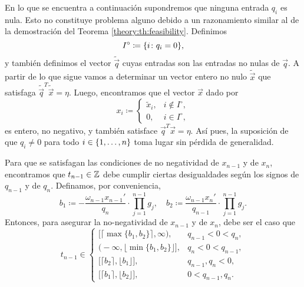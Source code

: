 En lo que se encuentra a continuación supondremos que ninguna entrada $q_i$ es nula. Esto no
constituye problema alguno debido a un razonamiento similar al de la demostración del Teorema
\ref{theory:th:feasibility}. Definimos
\begin{equation*}
	I^\circ \coloneq \lbrace i \colon q_i = 0 \rbrace,
\end{equation*}
y también definimos el vector $\tilde{\vec{q}}$ cuyas entradas son las entradas no nulas de
$\vec{q}$. A partir de lo que sigue vamos a determinar un vector entero no nulo $\tilde{\vec{x}}$
que satisfaga $\tilde{\vec{q}}^T\tilde{\vec{x}} = \eta$. Luego, encontramos que el vector $\vec{x}$
dado por
\begin{equation*}
	x_i \coloneq
	\begin{cases}
		\tilde{x}_i, & i \not \in I^\circ, \\
		0, & i \in I^\circ,
	\end{cases}
\end{equation*}
es entero, no negativo, y también satisface $\vec{q}^T\vec{x} = \eta$. Así pues, la suposición de
que $q_i \neq 0$ para todo $i \in \lbrace 1, \ldots, n \rbrace$ toma lugar sin pérdida de generalidad.

Para que se satisfagan las condiciones de no negatividad de $x_{n-1}$ y de $x_n$, encontramos que
$t_{n-1} \in \mathbb{Z}$ debe cumplir ciertas desigualdades según los signos de $q_{n-1}$ y de $q_n$.
Definamos, por conveniencia,
\begin{equation}
	\label{eq:lr-bounds}
	b_1 \coloneq -\frac{\omega_{n-1}x_{n-1}'}{q_n} \cdot \prod_{j=1}^{n-1}g_j, \quad
	b_2 \coloneq \frac{\omega_{n-1}x_{n}'}{q_{n-1}} \cdot \prod_{j=1}^{n-1}g_j.
\end{equation}
Entonces, para asegurar la no-negatividad de $x_{n - 1}$ y de $x_n$, debe ser el caso que
\begin{equation}
	\label{eq:feasible-param}
	t_{n-1} \in 
	\begin{cases}
		\big[ \lceil \max\lbrace b_1 ,  b_2 \rbrace \rceil, \infty \big), &  q_{n-1} < 0 < q_n, \\[0.5em]
		\big( -\infty, \lfloor \min\lbrace b_1, b_2\rbrace \rfloor \big], &  q_n < 0 < q_{n-1}, \\[0.5em]
		\big[ \lceil b_2 \rceil, \lfloor b_1 \rfloor \big], &  q_{n-1}, q_n < 0, \\[0.5em]
		\big[ \lceil b_1 \rceil, \lfloor b_2 \rfloor \big], &  0 < q_{n-1}, q_n.
	\end{cases}
\end{equation}

